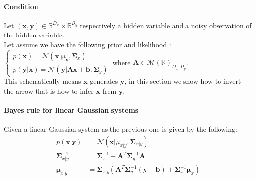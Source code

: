 \paragraph{Condition}
Let $(\bm{x}, \bm{y}) \in \mathbb{R}^{D_{x}}\times\mathbb{R}^{D_{y}}$ respectively a 
hidden variable and a noisy observation of the hidden variable.\\
Let assume we have the following prior and likelihood :
$ \begin{cases}
    p(\bm{x}) = \mathcal{N}\left(\bm{x}|\bm{\mu_{x}},\bm{\Sigma}_{x}\right)\\
    p(\bm{y}|\bm{x}) = \mathcal{N}\left(\bm{y}|\bm{A}\bm{x} + \bm{b}, \bm{\Sigma}_{y}
    \right)
\end{cases}$
where $\bm{A}\in\mathcal{M}(\mathbb{R})_{D_{x},D_{y}}$.\\
This schematically means $\bm{x}$ generates $\bm{y}$, in this section we show how to 
invert the arrow that is how to infer $\bm{x}$ from $\bm{y}$.

\paragraph{Bayes rule for linear Gaussian systems}
Given a linear Gaussian system as the previous one is given by the following: 
\begin{align*}
    p(\bm{x}|\bm{y}) &= \mathcal{N}\left(\bm{x}|\mu_{x|y},\bm{\Sigma}_{x|y}\right)\\ 
    \bm{\Sigma}_{x|y}^{-1} &= \bm{\Sigma}_{x}^{-1} + \bm{A}^{T}\bm{\Sigma}_{y}^{-1}
    \bm{A}\\
    \bm{\mu}_{x|y} &= \bm{\Sigma}_{x|y}\left(\bm{A}^{T}\bm{\Sigma}_{y}^{-1}(\bm{y}-\bm{b})
        + \bm{\Sigma}_{x}^{-1}\bm{\mu}_{x}\right)
\end{align*}

